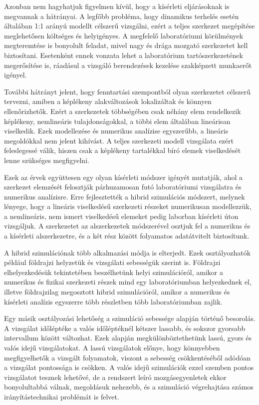 Azonban nem hagyhatjuk figyelmen kívül, hogy a kísérleti eljárásoknak is megvannak a hátrányai. A legfőbb probléma, hogy dinamikus terhelés esetén  általában 1:1 arányú modellt célszerű  vizsgálni, ezért a teljes szerkezet megépítése meglehetősen költséges  és helyigényes. A megfelelő laboratóriumi körülmények megteremtése is bonyolult  feladat, mivel nagy és drága  mozgató szerkezetet kell biztosítani. Esetenként ennek vonzata lehet a laboratórium tartószerkezetének megerősítése is, ráadásul a vizsgáló berendezések kezelése szakképzett munkaerőt igényel. 

További hátrányt jelent, hogy fenntartási szempontból  olyan szerkezetet célszerű tervezni, amiben a képlékeny alakváltozások lokalizáltak és könnyen ellenőrizhetők. Ezért a szerkezetek többségében csak néhány elem rendelkezik képlékeny, nemlineáris tulajdonságokkal, a többi elem általában lineárisan viselkedik. Ezek modellezése és numerikus analízise egyszerűbb, a lineáris megoldókkal nem jelent kihívást. A teljes szerkezeti modell vizsgálata ezért feleslegessé válik, hiszen csak a képlékeny tartalékkal bíró elemek viselkedését lenne szükséges megfigyelni.  

Ezek az érvek együttesen egy olyan kísérleti  módszer igényét mutatják, ahol a szerkezet elemzését felosztják párhuzamosan futó laboratóriumi vizsgálatra és  numerikus analízisre.  Erre fejlesztették a hibrid szimulációs módszert, melynek lényege, hogy  a lineáris viselkedésű szerkezeti részeket numerikusan modellezzük, a nemlineáris, nem ismert viselkedésű elemeket pedig laborban kísérleti úton vizsgáljuk. A szerkezetet az alszerkezetek módszerével osztjuk fel a numerikus és a kísérleti alszerkezetre, és a két rész között folyamatos adatátvitelt biztosítunk. 

A hibrid szimulációnak több alkalmazási módja is elterjedt. Ezek osztályozhatók például  földrajzi helyzetük és  vizsgálati sebességük szerint is. Földrajzi elhelyezkedésük tekintetében beszélhetünk helyi szimulációról, amikor a numerikus és fizikai szerkezeti részek mind egy laboratóriumban helyezkednek el, illetve földrajzilag megosztott hibrid szimulációról, amikor a numerikus és kísérleti analízis egyszerre több részletben több  laboratóriumban zajlik.

Egy másik osztályozási lehetőség a szimuláció sebessége alapján történő besorolás. A vizsgálat időléptéke  a valós időléptéknél kétszer lassabb, és sokszor gyorsabb intervallum között változhat. Ezek alapján megkülönböztethetünk lassú, gyors és valós idejű vizsgálatokat. A lassú vizsgálatok előnye, hogy könnyebben megfigyelhetők a vizsgált  folyamatok, viszont a sebesség csökkentéséből adódóan a vizsgálat pontossága is csökken. A valós idejű szimulációk ezzel szemben pontos vizsgálatot tesznek lehetővé, de a rendszert leíró mozgásegyenletek ekkor bonyolultabbá válnak, megoldásuk nehezebb, és a szimuláció végrehajtása számos  irányítástechnikai problémát is felvet. 


